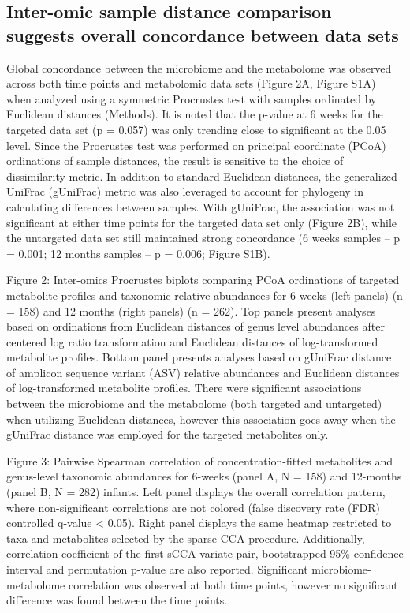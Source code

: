 \subsection{Inter-omic sample distance comparison suggests overall concordance between data sets} 
Global concordance between the microbiome and the metabolome was observed across both time points and metabolomic data sets (Figure 2A, Figure S1A) when analyzed using a symmetric Procrustes test with samples ordinated by Euclidean distances (Methods). It is noted that the p-value at 6 weeks for the targeted data set (p = 0.057) was only trending close to significant at the 0.05 level.  
Since the Procrustes test was performed on principal coordinate (PCoA) ordinations of sample distances, the result is sensitive to the choice of dissimilarity metric. In addition to standard Euclidean distances, the generalized UniFrac (gUniFrac) metric was also leveraged to account for phylogeny in calculating differences between samples. With gUniFrac, the association was not significant at either time points for the targeted data set only (Figure 2B), while the untargeted data set still maintained strong concordance (6 weeks samples – p = 0.001; 12 months samples – p = 0.006; Figure S1B). 
 
Figure 2: Inter-omics Procrustes biplots comparing PCoA ordinations of targeted metabolite profiles and taxonomic relative abundances for 6 weeks (left panels) (n = 158) and 12 months (right panels) (n = 262). Top panels present analyses based on ordinations from Euclidean distances of genus level abundances after centered log ratio transformation and Euclidean distances of log-transformed metabolite profiles. Bottom panel presents analyses based on gUniFrac distance of amplicon sequence variant (ASV) relative abundances and Euclidean distances of log-transformed metabolite profiles. There were significant associations between the microbiome and the metabolome (both targeted and untargeted) when utilizing Euclidean distances, however this association goes away when the gUniFrac distance was employed for the targeted metabolites only. 
 
Figure 3: Pairwise Spearman correlation of concentration-fitted metabolites and genus-level taxonomic abundances for 6-weeks (panel A, N = 158) and 12-months (panel B, N = 282) infants. Left panel displays the overall correlation pattern, where non-significant correlations are not colored (false discovery rate (FDR) controlled q-value < 0.05). Right panel displays the same heatmap restricted to taxa and metabolites selected by the sparse CCA procedure. Additionally, correlation coefficient of the first sCCA variate pair, bootstrapped 95\% confidence interval and permutation p-value are also reported. Significant microbiome-metabolome correlation was observed at both time points, however no significant difference was found between the time points.  
